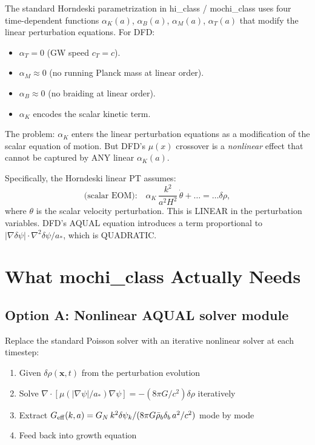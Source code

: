 \documentclass[11pt]{article}
\newcommand{\dpsi}{\delta\psi}
\newcommand{\Geff}{G_{\rm eff}}
\newcommand{\astar}{a_*}
\begin{document}
The standard Horndeski parametrization in hi\_class / mochi\_class
uses four time-dependent functions $\alpha_K(a)$, $\alpha_B(a)$,
$\alpha_M(a)$, $\alpha_T(a)$ that modify the linear perturbation
equations. For DFD:
\begin{itemize}
\item $\alpha_T = 0$ (GW speed $c_T = c$).
\item $\alpha_M \approx 0$ (no running Planck mass at linear order).
\item $\alpha_B \approx 0$ (no braiding at linear order).
\item $\alpha_K$ encodes the scalar kinetic term.
\end{itemize}

The problem: $\alpha_K$ enters the linear perturbation equations as
a modification of the scalar equation of motion. But DFD's $\mu(x)$
crossover is a \emph{nonlinear} effect that cannot be captured by
ANY linear $\alpha_K(a)$.

Specifically, the Horndeski linear PT assumes:
\begin{equation}
\text{(scalar EOM):}\quad
\alpha_K\,\frac{k^2}{a^2 H^2}\,\dot\theta + \ldots = \ldots\delta\rho,
\end{equation}
where $\theta$ is the scalar velocity perturbation. This is LINEAR
in the perturbation variables. DFD's AQUAL equation introduces a
term proportional to $|\nabla\dpsi| \cdot \nabla^2\dpsi / \astar$,
which is QUADRATIC.

\section{What mochi\_class Actually Needs}

\subsection{Option A: Nonlinear AQUAL solver module}

Replace the standard Poisson solver with an iterative nonlinear
solver at each timestep:
\begin{enumerate}
\item Given $\delta\rho(\mathbf{x}, t)$ from the perturbation evolution
\item Solve $\nabla\cdot[\mu(|\nabla\psi|/\astar)\nabla\psi]
  = -(8\pi G/c^2)\delta\rho$ iteratively
\item Extract $\Geff(k, a) = G_N\,k^2\dpsi_k / (8\pi G\bar\rho_b\delta_b\,a^2/c^2)$
  mode by mode
\item Feed back into growth equation
\end{enumerate}
\end{document}
